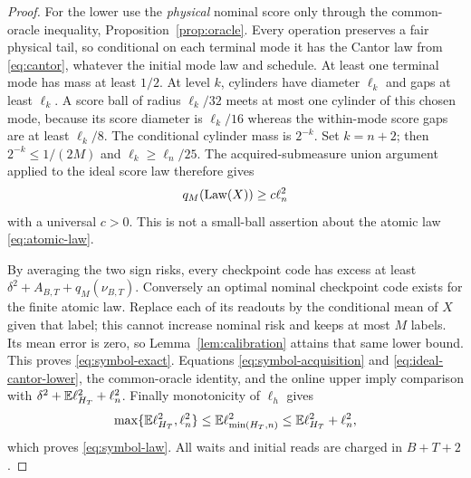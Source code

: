 \begin{proof}
For the lower use the \emph{physical} nominal score only through the common-oracle inequality, Proposition~\ref{prop:oracle}. Every operation preserves a fair physical tail, so conditional on each terminal mode it has the Cantor law from \eqref{eq:cantor}, whatever the initial mode law and schedule. At least one terminal mode has mass at least $1/2$. At level $k$, cylinders have diameter $\ell_k$ and gaps at least $\ell_k$. A score ball of radius $\ell_k/32$ meets at most one cylinder of this chosen mode, because its score diameter is $\ell_k/16$ whereas the within-mode score gaps are at least $\ell_k/8$. The conditional cylinder mass is $2^{-k}$. Set $k=n+2$; then $2^{-k}\le1/(2M)$ and $\ell_k\ge\ell_n/25$. The acquired-submeasure union argument applied to the ideal score law therefore gives
\begin{equation}\label{eq:ideal-cantor-lower}
 q_M(\operatorname{Law}(X))\ge c\ell_n^2
\end{equation}
with a universal $c>0$. This is not a small-ball assertion about the atomic law \eqref{eq:atomic-law}.

By averaging the two sign risks, every checkpoint code has excess at least $\delta^2+A_{B,T}+q_M(\nu_{B,T})$. Conversely an optimal nominal checkpoint code exists for the finite atomic law. Replace each of its readouts by the conditional mean of $X$ given that label; this cannot increase nominal risk and keeps at most $M$ labels. Its mean error is zero, so Lemma~\ref{lem:calibration} attains that same lower bound. This proves \eqref{eq:symbol-exact}. Equations \eqref{eq:symbol-acquisition} and \eqref{eq:ideal-cantor-lower}, the common-oracle identity, and the online upper imply comparison with $\delta^2+\mathbb E\ell_{H_T}^2+\ell_n^2$. Finally monotonicity of $\ell_h$ gives
\[
 \max\{\mathbb E\ell_{H_T}^2,\ell_n^2\}
 \le\mathbb E\ell_{\min(H_T,n)}^2
 \le\mathbb E\ell_{H_T}^2+\ell_n^2,
\]
which proves \eqref{eq:symbol-law}. All waits and initial reads are charged in $B+T+2$.
\end{proof}

